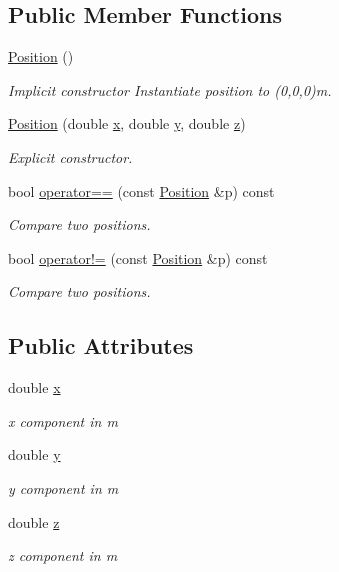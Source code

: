 \subsection*{Public Member Functions}
\begin{DoxyCompactItemize}
\item 
\hyperlink{structPosition_a369a577425f8ba02e8750d04b6a088db}{Position} ()
\begin{DoxyCompactList}\small\item\em Implicit constructor Instantiate position to (0,0,0)m. \end{DoxyCompactList}\item 
\hyperlink{structPosition_a039074b4b66e3b570ea2f4e14583b0e0}{Position} (double \hyperlink{structPosition_a9abbe738bad177de91fe4774099c1260}{x}, double \hyperlink{structPosition_a75f48c2a1d2c7131b8be1a0687ae72c8}{y}, double \hyperlink{structPosition_ab26043bc2f8f6094818c17dd44e43228}{z})
\begin{DoxyCompactList}\small\item\em Explicit constructor. \end{DoxyCompactList}\item 
bool \hyperlink{structPosition_abf82a72c9a5f64a4dfce9691bd3010ed}{operator==} (const \hyperlink{structPosition}{Position} \&p) const 
\begin{DoxyCompactList}\small\item\em Compare two positions. \end{DoxyCompactList}\item 
bool \hyperlink{structPosition_aac2ef88bfed1a5370bb4c2921046e9c0}{operator!=} (const \hyperlink{structPosition}{Position} \&p) const 
\begin{DoxyCompactList}\small\item\em Compare two positions. \end{DoxyCompactList}\end{DoxyCompactItemize}
\subsection*{Public Attributes}
\begin{DoxyCompactItemize}
\item 
double \hyperlink{structPosition_a9abbe738bad177de91fe4774099c1260}{x}
\begin{DoxyCompactList}\small\item\em x component in m \end{DoxyCompactList}\item 
double \hyperlink{structPosition_a75f48c2a1d2c7131b8be1a0687ae72c8}{y}
\begin{DoxyCompactList}\small\item\em y component in m \end{DoxyCompactList}\item 
double \hyperlink{structPosition_ab26043bc2f8f6094818c17dd44e43228}{z}
\begin{DoxyCompactList}\small\item\em z component in m \end{DoxyCompactList}\end{DoxyCompactItemize}


